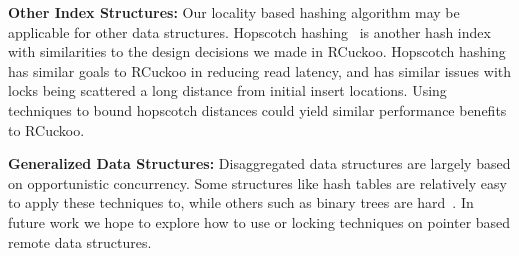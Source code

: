 \textbf{Other Index Structures:} Our locality based hashing
algorithm may be applicable for other data structures.
Hopscotch hashing~\cite{hopscotch} is another hash index
with similarities to the design decisions we made in
RCuckoo. Hopscotch hashing has similar goals to RCuckoo in
reducing read latency, and has similar issues with locks
being scattered a long distance from initial insert
locations. Using techniques to bound hopscotch distances
could yield similar performance benefits to RCuckoo.

\textbf{Generalized Data Structures:} Disaggregated data
structures are largely based on opportunistic concurrency.
Some structures like hash tables are relatively easy to
apply these techniques to, while others such as binary trees
are hard~\cite{nonb-binary}. In future work we hope to
explore how to use or locking techniques on pointer based
remote data structures.
